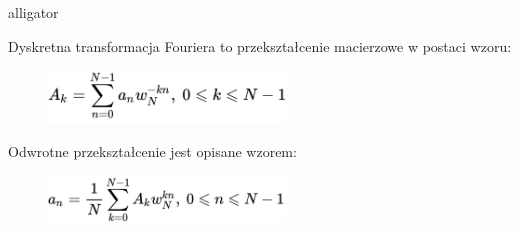 \documentclass[12pt]{article}
\begin{document}
\begin{labeling}{alligator}


\item [Dyskretna transformacja Fouriera] to przekształcenie macierzowe w postaci wzoru:
\\
\begin{figure}[h!]
 \centering
 \includegraphics[width=6.3cm]{dft.PNG}
 \vspace{-0.3cm}
 \label{Widok_aplikacjis}
\end{figure}
Odwrotne przekształcenie jest opisane wzorem:
\begin{figure}[h!]
 \centering
 \includegraphics[width=6.3cm]{dftO.PNG}
 \vspace{-0.3cm}
 \label{Splot_indeks}
\end{figure}


\end{labeling}
\end{document}

